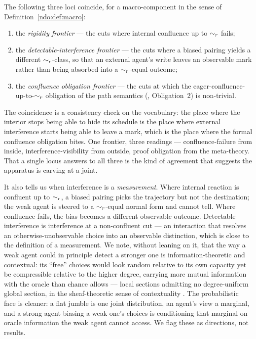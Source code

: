 \begin{proposition}\label{ndo:prop:frontier}
The following three loci coincide, for a macro-component in the sense of
Definition~\ref{ndo:def:macro}:
\begin{enumerate}[label=(\roman*),leftmargin=2.2em]
\item the \emph{rigidity frontier} --- the cuts where internal confluence up to
$\sim_{r}$ fails;
\item the \emph{detectable-interference frontier} --- the cuts where a biased
pairing yields a different $\sim_{r}$-class, so that an external agent's write
leaves an observable mark rather than being absorbed into a $\sim_{r}$-equal
outcome;
\item the \emph{confluence obligation frontier} --- the cuts at which the
eager-confluence-up-to-$\sim_{r}$ obligation of the path semantics
(\cite{paths}, Obligation~2) is non-trivial.
\end{enumerate}
\end{proposition}

\noindent
The coincidence is a consistency check on the vocabulary: the place where the
interior stops being able to hide its schedule is the place where external
interference starts being able to leave a mark, which is the place where the
formal confluence obligation bites. One frontier, three readings ---
confluence-failure from inside, interference-visibility from outside, proof
obligation from the meta-theory. That a single locus answers to all three is the
kind of agreement that suggests the apparatus is carving at a joint.

It also tells us when interference is a \emph{measurement}. Where internal reaction
is confluent up to $\sim_{r}$, a biased pairing picks the trajectory but not the
destination; the weak agent is steered to a $\sim_{r}$-equal normal form and cannot
tell. Where confluence fails, the bias becomes a different observable outcome.
Detectable interference is interference at a non-confluent cut --- an interaction
that resolves an otherwise-unobservable choice into an observable distinction,
which is close to the definition of a measurement. We note, without leaning on it,
that the way a weak agent could in principle detect a stronger one is
information-theoretic and contextual: its ``free'' choices would look random
relative to its own capacity yet be compressible relative to the higher degree,
carrying more mutual information with the oracle than chance allows --- local
sections admitting no degree-uniform global section, in the
sheaf-theoretic sense of contextuality \cite{abramsky}. The probabilistic face is
cleaner: a flat jumble is one joint distribution, an agent's view a marginal, and a
strong agent biasing a weak one's choices is conditioning that marginal on oracle
information the weak agent cannot access. We flag these as directions, not results.


